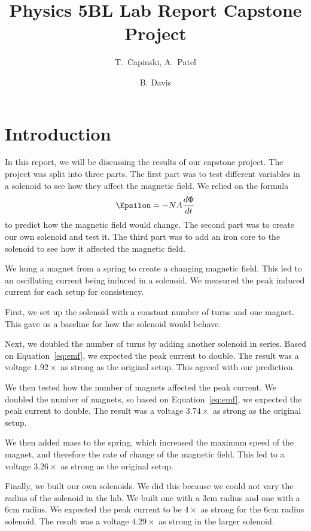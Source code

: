 \documentclass[11pt]{article}
\title{Physics 5BL Lab Report Capstone Project}
\author{T.~Capinski, A.~Patel \and B. Davis}
\let\oldsection\section
\renewcommand\section{\clearpage\oldsection}
\begin{document}
    \maketitle
    \tableofcontents

    \section*{Introduction}\label{sec:introduction}

    In this report, we will be discussing the results of our capstone project.
    The project was split into three parts.
    The first part was to test different variables in a solenoid to see how they affect the magnetic field.
    We relied on the formula
    \begin{equation}
        \Epsilon = -N A \frac{d\Phi}{dt}
        \label{eq:emf}
    \end{equation}
    to predict how the magnetic field would change.
    The second part was to create our own solenoid and test it.
    The third part was to add an iron core to the solenoid to see how it affected the magnetic field.

    We hung a magnet from a spring to create a changing magnetic field.
    This led to an oscillating current being induced in a solenoid.
    We measured the peak induced current for each setup for consistency.

    First, we set up the solenoid with a constant number of turns and one magnet.
    This gave us a baseline for how the solenoid would behave.

    Next, we doubled the number of turns by adding another solenoid in series.
    Based on Equation~\ref{eq:emf}, we expected the peak current to double.
    The result was a voltage $1.92 \times$ as strong as the original setup.
    This agreed with our prediction.

    We then tested how the number of magnets affected the peak current.
    We doubled the number of magnets, so based on Equation~\ref{eq:emf}, we expected the peak current to double.
    The result was a voltage $3.74 \times$ as strong as the original setup.

    We then added mass to the spring, which increased the maximum speed of the magnet, and therefore the rate of change of the magnetic field.
    This led to a voltage $3.26 \times$ as strong as the original setup.

    Finally, we built our own solenoids.
    We did this because we could not vary the radius of the solenoid in the lab.
    We built one with a 3cm radius and one with a 6cm radius.
    We expected the peak current to be $4 \times$ as strong for the 6cm radius solenoid.
    The result was a voltage $4.29 \times$ as strong in the larger solenoid.
\end{document}
